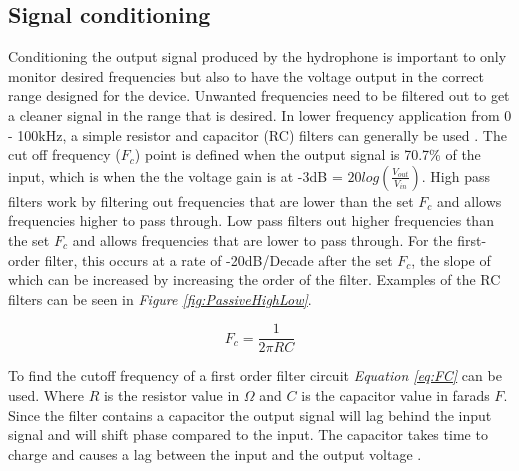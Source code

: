 
\subsection{Signal conditioning}

Conditioning the output signal produced by the hydrophone is important to only monitor desired frequencies but also to have the voltage output in the correct range designed for the device.
Unwanted frequencies need to be filtered out to get a cleaner signal in the range that is desired.
In lower frequency application from 0 - 100kHz, a simple resistor and capacitor (RC) filters can generally be used \cite{noauthor_low_2013}.
The cut off frequency ($F_c$) point is defined when the output signal is 70.7\% of the input, which is when the the voltage gain is at -3dB = $20log(\frac{V_{out}}{V_{in}})$.
High pass filters work by filtering out frequencies that are lower than the set $F_c$ and allows frequencies higher to pass through.
Low pass filters out higher frequencies than the set $F_c$ and allows frequencies that are lower to pass through. 
For the first-order filter, this occurs at a rate of -20dB/Decade after the set $F_c$, the slope of which can be increased by increasing the order of the filter.
Examples of the RC filters can be seen in \textit{Figure \ref{fig:PassiveHighLow}}.


\begin{equation}
    F_c = \frac{1}{2\pi RC}
    \label{eq:FC}
\end{equation}

To find the cutoff frequency of a first order filter circuit \textit{Equation \ref{eq:FC}} can be used.
Where $R$ is the resistor value in $\Omega$ and $C$ is the capacitor value in farads $F$.
Since the filter contains a capacitor the output signal will lag behind the input signal and will shift phase compared to the input. 
The capacitor takes time to charge and causes a lag between the input and the output voltage \cite{noauthor_low_2013}. 

